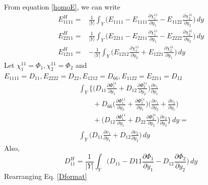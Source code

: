\documentclass[10pt]{article}
\begin{document}
From equation \eqref{homoE}, we can write
\begin{eqnarray}
E^H_{1111} = &\frac{1}{|Y|}\int_Y\bigg ( E_{1111} - E_{1111}\frac{\partial \chi^{11}_1}{\partial y_1} - E_{1122}\frac{\partial \chi^{11}_2}{\partial y_2}\bigg )\,dy\\
E^H_{2211} = &\frac{1}{|Y|}\int_Y\bigg ( E_{2211} - E_{2211}\frac{\partial \chi^{11}_1}{\partial y_1} - E_{2222}\frac{\partial \chi^{11}_2}{\partial y_2}\bigg )\,dy\\
E^H_{1211} = &-\frac{1}{|Y|}\int_Y\bigg (E_{1212}\frac{\partial \chi^{11}_1}{\partial y_2} + E_{1221}\frac{\partial \chi^{11}_2}{\partial y_1}\bigg )\,dy
\end{eqnarray}
Let $\chi^{11}_1 = \Phi_1, \chi^{11}_2 = \Phi_2$ and $E_{1111} = D_{11}, E_{2222} = D_{22}, E_{1212} = D_{66}, E_{1122} = E_{2211} = D_{12}$
\begin{equation}\label{Dformat}
\begin{split}
&\int_Y \bigg \{\bigg ( D_{11}\frac{\partial \Phi^{11}_1}{\partial y_1} + D_{12}\frac{\partial \Phi^{11}_2}{\partial y_2}\bigg )\frac{\partial v_1}{\partial y_1}\\
&\qquad + D_{66}\bigg (\frac{\partial \Phi^{11}_1}{\partial y_2} + \frac{\partial \Phi^{11}_2}{\partial y_1}\bigg )\bigg (\frac{\partial v_1}{\partial y_2} +\frac{\partial v_2}{\partial y_1}\bigg )\\
&\qquad + \bigg (D_{12}\frac{\partial \Phi^{11}_1}{\partial y_1} + D_{22}\frac{\partial \Phi^{11}_2}{\partial y_2}\bigg )\frac{\partial v_2}{\partial y_2}\bigg \}\,dy = \\
&\int_Y\bigg (D_{11}\frac{\partial v_1}{\partial y_1}+D_{12}\frac{\partial v_2}{\partial y_2}\bigg )\, dy
\end{split}
\end{equation}
Also, 
\begin{equation}\label{Dhomo}
D^H_{11} = \frac{1}{|Y|}\int_Y\bigg (D_{11}-D{11}\frac{\partial\Phi_1}{\partial y_1} - D_{12}\frac{\partial \Phi_2}{\partial y_2}\bigg )\,dy
\end{equation}
Rearranging Eq. \eqref{Dformat}
\end{document}
